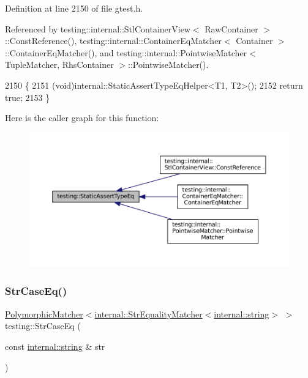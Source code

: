 Definition at line 2150 of file gtest.\+h.



Referenced by testing\+::internal\+::\+Stl\+Container\+View$<$ Raw\+Container $>$\+::\+Const\+Reference(), testing\+::internal\+::\+Container\+Eq\+Matcher$<$ Container $>$\+::\+Container\+Eq\+Matcher(), and testing\+::internal\+::\+Pointwise\+Matcher$<$ Tuple\+Matcher, Rhs\+Container $>$\+::\+Pointwise\+Matcher().


\begin{DoxyCode}
2150                           \{
2151   (void)internal::StaticAssertTypeEqHelper<T1, T2>();
2152   \textcolor{keywordflow}{return} \textcolor{keyword}{true};
2153 \}
\end{DoxyCode}
Here is the caller graph for this function\+:
\nopagebreak
\begin{figure}[H]
\begin{center}
\leavevmode
\includegraphics[width=350pt]{namespacetesting_a661e70fc6afeb5c085eed3716aa45059_icgraph}
\end{center}
\end{figure}
\mbox{\label{namespacetesting_addbdb8c0902ab09cade24fa6db7c0073}} 
\subsubsection{\texorpdfstring{Str\+Case\+Eq()}{StrCaseEq()}}
{\footnotesize\ttfamily \hyperlink{classtesting_1_1PolymorphicMatcher}{Polymorphic\+Matcher}$<$\hyperlink{classtesting_1_1internal_1_1StrEqualityMatcher}{internal\+::\+Str\+Equality\+Matcher}$<$\hyperlink{namespacetesting_1_1internal_a8e8ff5b11e64078831112677156cb111}{internal\+::string}$>$ $>$ testing\+::\+Str\+Case\+Eq (\begin{DoxyParamCaption}\item[{const \hyperlink{namespacetesting_1_1internal_a8e8ff5b11e64078831112677156cb111}{internal\+::string} \&}]{str }\end{DoxyParamCaption})\hspace{0.3cm}{\ttfamily [inline]}}



